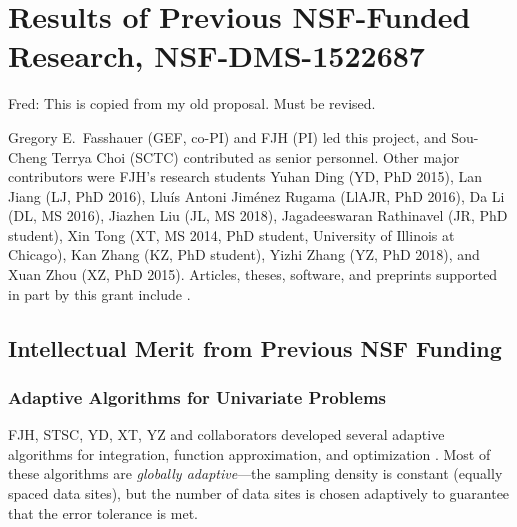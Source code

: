 \documentclass[11pt]{NSFamsart}
\newcommand{\FJHNote}[1]{{\color{blue}Fred: #1}}
\begin{document}
\section{Results of Previous NSF-Funded Research,
NSF-DMS-1522687} \label{sec:Previous}
\FJHNote{This is copied from my old proposal.  Must be revised.}

Gregory E.\ Fasshauer (GEF, co-PI) and FJH (PI) led this project, and Sou-Cheng Terrya Choi (SCTC) contributed as senior personnel.  Other major contributors were FJH's research students Yuhan Ding (YD, PhD 2015), Lan Jiang (LJ, PhD 2016), 
Llu\'is Antoni Jim\'enez Rugama (LlAJR, PhD 2016), Da Li (DL, MS 2016), Jiazhen Liu (JL, MS 2018), Jagadeeswaran Rathinavel (JR, 
PhD student), Xin Tong (XT, MS 2014, PhD student, University of Illinois at Chicago), Kan Zhang (KZ, PhD student), Yizhi Zhang (YZ, PhD 2018), and Xuan Zhou (XZ, PhD 2015).  Articles, theses,  
software, and preprints supported in 
part by this 
grant 
include 
\cite{ala_augmented_2017, 
	ChoEtal17a,
	ChoEtal17b,
	Din15a, 
	DinHic20a,
	GilEtal16a,
	Hic17a,
	HicJag18b,
	HicJim16a,
	HicEtal18a,
	HicEtal17a,
	HicKriWoz19a,
	RatHic19a,
	GilJim16b,
	JimHic16a,
	JohFasHic18a,
	Li16a,
	Liu17a,
	MarEtal18a,
	mccourt_stable_2017,
	MCCEtal19a,
	mishra_hybrid_2018,
	MisEtal19a,
	rashidinia_stable_2016,
	rashidinia_stable_2018,
	Zha18a,
	Zha17a,
	Zho15a,
	ZhoHic15a}.

\subsection{Intellectual Merit from Previous NSF Funding}
\label{previousmeritsubsec}

\subsubsection{Adaptive Algorithms for Univariate Problems} \label{sec:localadpat}
FJH, STSC, YD, XT, YZ and collaborators developed several adaptive algorithms for integration, function approximation, and optimization \cite{ChoEtal17a, Din15a, HicEtal14b, Ton14a, Zha18a}.  Most of these algorithms are \emph{globally adaptive}---the sampling density is constant (equally spaced data sites), but the number of data sites is chosen adaptively to guarantee that the error tolerance is met.
\end{document}
